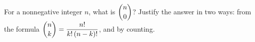 For a nonnegative integer $n$, what is $\dbinom n0$? Justify the answer in two ways: from the formula $\dbinom nk=\dfrac{n!}{k!\,(n-k)!}$, and by counting.
